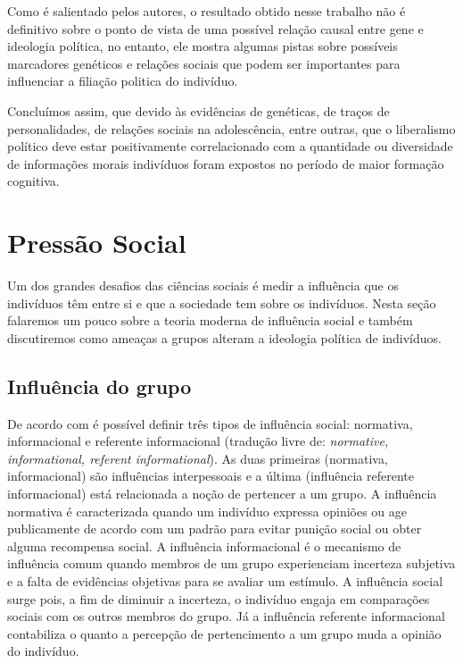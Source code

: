 Como é salientado pelos autores, o resultado obtido nesse trabalho não
é definitivo sobre o  ponto de vista de uma possível relação causal
entre gene e ideologia política, no entanto, ele mostra algumas pistas
sobre possíveis marcadores genéticos e relações sociais que podem ser
importantes para influenciar a filiação politica do indivíduo.

Concluímos assim, que devido às evidências de genéticas, de traços
de personalidades, de relações sociais na adolescência, entre outras,
que o liberalismo político deve estar positivamente correlacionado com a
quantidade ou diversidade de informações morais indivíduos foram expostos
no período de maior formação cognitiva.

\section{Pressão Social} %
\label{sec:pressao}

Um dos grandes desafios das ciências sociais é medir a influência que os 
indivíduos têm entre si e que a sociedade tem sobre os indivíduos. Nesta seção
falaremos um pouco sobre a teoria moderna de influência social e também
discutiremos como ameaças a grupos alteram a ideologia política de indivíduos.

\subsection{Influência do grupo} %
\label{subsec:insoci}

De acordo com  é possível definir três tipos de influência
social: normativa, informacional e referente informacional (tradução livre de:
\textit{normative, informational, referent informational}). As duas primeiras
(normativa, informacional) são influências interpessoais e a última
(influência referente informacional) está relacionada a noção de pertencer
a um grupo.  A influência normativa é caracterizada quando um indivíduo
expressa opiniões ou age publicamente de acordo com um padrão  para evitar
punição social ou obter alguma recompensa social.  A influência informacional é
o mecanismo de influência comum quando membros de um grupo experienciam
incerteza subjetiva e a falta de evidências objetivas para se avaliar um
estímulo. A influência social surge pois, a fim de diminuir a incerteza, o
indivíduo engaja em comparações sociais com os outros membros do grupo. 
Já a influência referente informacional contabiliza o quanto a percepção de
pertencimento a um grupo muda a opinião do indivíduo. 
            
